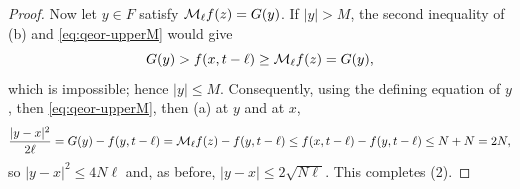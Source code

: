 \begin{proof}
Now let $y\in F$ satisfy $\mathcal{M}_\ell f(z)=G(y)$. If $|y|>M$, the second
inequality of (b) and \eqref{eq:qeor-upperM} would give
\[
  G(y)>f(x,t-\ell)\ge\mathcal{M}_\ell f(z)=G(y),
\]
which is impossible; hence $|y|\le M$. Consequently, using the defining equation
of $y$, then \eqref{eq:qeor-upperM}, then (a) at $y$ and at $x$,
\begin{equation}\label{eq:qeor-collapseM}
  \frac{|y-x|^2}{2\ell}
  =G(y)-f(y,t-\ell)
  =\mathcal{M}_\ell f(z)-f(y,t-\ell)
  \le f(x,t-\ell)-f(y,t-\ell)
  \le N+N=2N ,
\end{equation}
so $|y-x|^2\le4N\ell$ and, as before, $|y-x|\le2\sqrt{N\ell}$. This completes
(2).
\end{proof}
